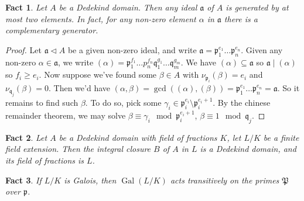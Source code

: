 \documentclass[12pt]{article}
\newtheorem*{fact*}{Fact}
\newtheorem*{fact_plus_nomn*}{Fact + Nomenclature}
\renewcommand{\a}{\mathfrak{a}}
\newcommand{\abs}[1]{\left\lvert#1\right\rvert}
\newcommand{\eps}{\varepsilon}
\newcommand{\ideal}{\triangleleft}
\newcommand{\p}{\mathfrak{p}}
\newcommand{\q}{\mathfrak{q}}
\newcommand{\too}{\longrightarrow}
\DeclareMathOperator{\Gal}{Gal}
\newcommand{\Pp}{\mathfrak{P}}
\begin{document}
\begin{fact*}
Let $A$ be a Dedekind domain. Then any ideal $\a$ of $A$ is generated by at most two elements. In fact, for any non-zero element $\alpha$ in $\a$ there is a complementary generator.
\end{fact*}

\begin{proof}
Let $\a\ideal A$ be a given non-zero ideal, and write $\a = \p_1^{e_1}\dots\p_n^{e_n}$. Given any non-zero $\alpha\in\a$, we write $(\alpha) = \p_1^{f_1}\dots p_n^{f_n}\q_1^{g_1}\dots\q_m^{g_m}$. We have $(\alpha)\subseteq \a$ so $\a\mid(\alpha)$ so $f_i\ge e_i$. Now suppose we've found some $\beta\in A$ with $\nu_{\p_i}(\beta)=e_i$ and $\nu_{\q_j}(\beta)=0$. Then we'd have $(\alpha,\beta)=\gcd((\alpha),(\beta))=\p_1^{e_1}\dots\p_n^{e_n}=\a$. So it remains to find such $\beta$. To do so, pick some $\gamma_i\in\p_i^{e_i}\setminus\p_i^{e_i+1}$. By the chinese remainder theorem, we may solve $\beta\equiv \gamma_i \mod \p_i^{e_i+1}$, $\beta\equiv 1\mod \q_j$.
\end{proof}

\begin{fact*}
Let $A$ be a Dedekind domain with field of fractions $K$, let $L/K$ be a finite field extension. Then the integral closure $B$ of $A$ in $L$ is a Dedekind domain, and its field of fractions is $L$.
\end{fact*}

\begin{fact*}
If $L/K$ is Galois, then $\Gal(L/K)$ acts transitively on the primes $\Pp$ over $\p$.
\end{fact*}








\end{document}
